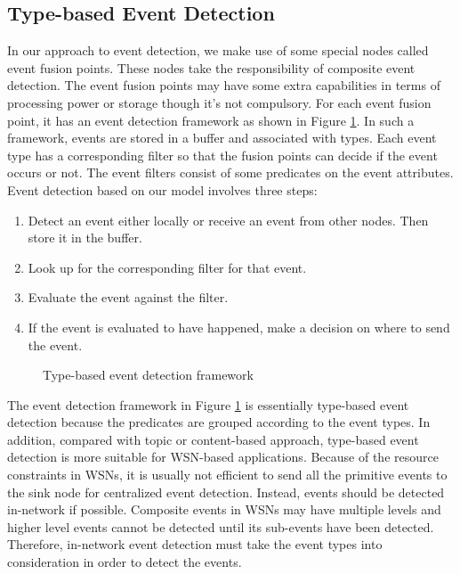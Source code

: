 \subsection{Type-based Event Detection}
In our approach to event detection, we make use of some special nodes called event fusion points. These nodes take the responsibility of composite event detection. The event fusion points may have some extra capabilities in terms of processing power or storage though it's not compulsory. For each event fusion point, it has an event detection framework as shown in Figure \ref{fig:eventdetectionframework2}. In such a framework, events are stored in a buffer and associated with types. Each event type has a corresponding filter so that the fusion points can decide if the event occurs or not. The event filters consist of some predicates on the event attributes.
Event detection based on our model involves three steps:
\begin{enumerate}
\item Detect an event either locally or receive an event from other nodes. Then store it in the buffer. 
\item Look up for the corresponding filter for that event.
\item Evaluate the event against the filter.
\item If the event is evaluated to have happened, make a decision on where to send the event.
\end{enumerate}

\begin{figure}
\centering
{}
\caption{Type-based event detection framework}
\label{fig:eventdetectionframework2}
\end{figure}

The event detection framework in Figure \ref{fig:eventdetectionframework2} is essentially type-based event detection because the predicates are grouped according to the event types. In addition, compared with topic or content-based approach, type-based event detection is more suitable for WSN-based applications. Because of the resource constraints in WSNs, it is usually not efficient to send all the primitive events to the sink node for centralized event detection. Instead, events should be detected in-network if possible. Composite events in WSNs may have multiple levels and higher level events cannot be detected until its sub-events have been detected. Therefore, in-network event detection must take the event types into consideration in order to detect the events.  

\begin{comment}
Second, pure topic based event detection may not be suitable for WSNs because many WSNs require events that have different data types or topics. For example the detection of fire may require both temperature and light event topics. Without considering event types, it is very difficult to do in-network composite events detection just based on the event topics. Third, similar to topic based event detection, content based event detection without considering event types can only filter the primitive events and may not be efficient if the lower-level events occur with a much higher frequency than composite events.
\end{comment}